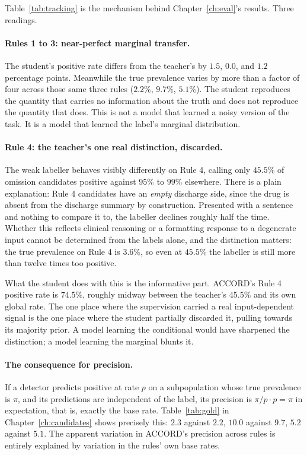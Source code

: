 Table~\ref{tab:tracking} is the mechanism behind Chapter~\ref{ch:eval}'s
results. Three readings.

\paragraph{Rules 1 to 3: near-perfect marginal transfer.} The student's positive
rate differs from the teacher's by $1.5$, $0.0$, and $1.2$ percentage points.
Meanwhile the true prevalence varies by more than a factor of four across those
same three rules ($2.2\%$, $9.7\%$, $5.1\%$). The student reproduces the
quantity that carries no information about the truth and does not reproduce the
quantity that does. This is not a model that learned a noisy version of the
task. It is a model that learned the label's marginal distribution.

\paragraph{Rule 4: the teacher's one real distinction, discarded.} The weak
labeller behaves visibly differently on Rule 4, calling only $45.5\%$ of
omission candidates positive against $95\%$ to $99\%$ elsewhere. There is a plain
explanation: Rule 4 candidates have an \emph{empty} discharge side, since the
drug is absent from the discharge summary by construction. Presented with a
sentence and nothing to compare it to, the labeller declines roughly half the
time. Whether this reflects clinical reasoning or a formatting response to a
degenerate input cannot be determined from the labels alone, and the distinction
matters: the true prevalence on Rule 4 is $3.6\%$, so even at $45.5\%$ the
labeller is still more than twelve times too positive.

What the student does with this is the informative part. ACCORD's Rule 4
positive rate is $74.5\%$, roughly midway between the teacher's $45.5\%$ and its
own global rate. The one place where the supervision carried a real
input-dependent signal is the one place where the student partially discarded
it, pulling towards its majority prior. A model learning the conditional would
have sharpened the distinction; a model learning the marginal blunts it.

\paragraph{The consequence for precision.} If a detector predicts positive at
rate $p$ on a subpopulation whose true prevalence is $\pi$, and its predictions
are independent of the label, its precision is $\pi / p \cdot p = \pi$ in
expectation, that is, exactly the base rate. Table~\ref{tab:gold} in
Chapter~\ref{ch:candidates} shows precisely this: $2.3$ against $2.2$, $10.0$
against $9.7$, $5.2$ against $5.1$. The apparent variation in ACCORD's precision
across rules is entirely explained by variation in the rules' own base rates.

